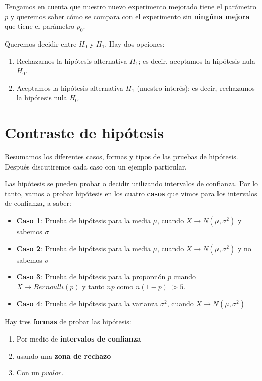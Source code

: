 \documentclass[
]{book}
\providecommand{\tightlist}{%
  \setlength{\itemsep}{0pt}\setlength{\parskip}{0pt}}
\begin{document}
Tengamos en cuenta que nuestro nuevo experimento mejorado tiene el parámetro \(p\) y queremos saber cómo se compara con el experimento sin \textbf{ningúna mejora} que tiene el parámetro \(p_0\).

Queremos decidir entre \(H_0\) y \(H_1\). Hay dos opciones:

\begin{enumerate}
\def\labelenumi{\arabic{enumi}.}
\item
  Rechazamos la hipótesis alternativa \(H_1\); es decir, aceptamos la hipótesis nula \(H_0\).
\item
  Aceptamos la hipótesis alternativa \(H_1\) (nuestro interés); es decir, rechazamos la hipótesis nula \(H_0\).
\end{enumerate}

\hypertarget{contraste-de-hipuxf3tesis-1}{%
\section{Contraste de hipótesis}\label{contraste-de-hipuxf3tesis-1}}

Resumamos los diferentes casos, formas y tipos de las pruebas de hipótesis. Después discutiremos cada caso con un ejemplo particular.

Las hipótesis se pueden probar o decidir utilizando intervalos de confianza. Por lo tanto, vamos a probar hipótesis en los cuatro \textbf{casos} que vimos para los intervalos de confianza, a saber:

\begin{itemize}
\item
  \textbf{Caso 1}: Prueba de hipótesis para la media \(\mu\), cuando \(X \rightarrow N(\mu, \sigma^2)\) y sabemos \(\sigma\)
\item
  \textbf{Caso 2}: Prueba de hipótesis para la media \(\mu\), cuando \(X \rightarrow N(\mu, \sigma^2)\) y no sabemos \(\sigma\)
\item
  \textbf{Caso 3}: Prueba de hipótesis para la proporción \(p\) cuando \(X \rightarrow Bernoulli(p)\) y tanto \(np\) como \(n(1-p)\) \(> 5\).
\item
  \textbf{Caso 4}: Prueba de hipótesis para la varianza \(\sigma^2\), cuando \(X \rightarrow N(\mu, \sigma^2)\)
\end{itemize}

Hay tres \textbf{formas} de probar las hipótesis:

\begin{enumerate}
\def\labelenumi{\arabic{enumi}.}
\tightlist
\item
  Por medio de \textbf{intervalos de confianza}
\item
  usando una \textbf{zona de rechazo}
\item
  Con un \(pvalor\).
\end{enumerate}
\end{document}
